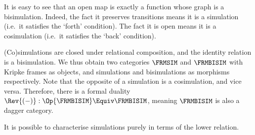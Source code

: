 \documentclass[10pt,a4paper]{article}
\begin{document}
It is easy to see that an open map is exactly a function whose graph is a
bisimulation. Indeed, the fact it preserves transitions means it is a simulation
(i.e.\ it satisfies the `forth' condition). The fact it is open means it is a
cosimulation (i.e.\ it satisfies the `back' condition).

(Co)simulations are closed under relational composition, and the identity
relation is a bisimulation. We thus obtain two categories \(\FRMSIM\) and
\(\FRMBISIM\) with Kripke frames as objects, and simulations and bisimulations
as morphisms respectively. Note that the opposite of a simulation is a
cosimulation, and vice versa. Therefore, there is a formal duality \(\Rev{(-)} :
\Op{\FRMBISIM} \Equiv \FRMBISIM\), meaning \(\FRMBISIM\) is also a dagger
category.

It is possible to characterise simulations purely in terms of the lower
relation.
\end{document}
